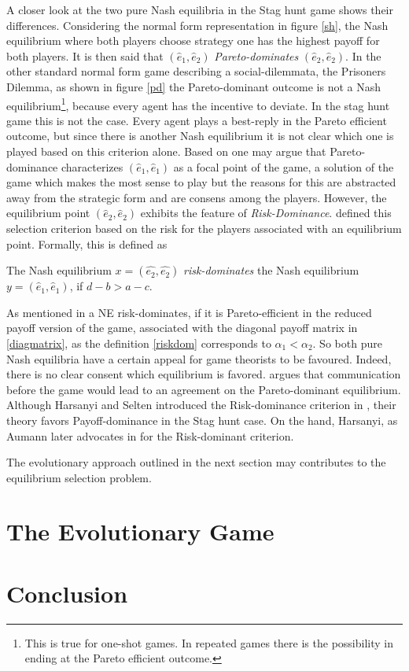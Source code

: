 \documentclass[12pt]{article}
\begin{document}
A closer look at the two pure Nash equilibria in the Stag hunt game 
shows their differences. Considering the normal form representation in figure 
\ref{sh}, the Nash equilibrium where both players choose strategy one has the highest payoff
for both players. It is then said that $(\hat{e}_1,\hat{e}_2)$ 
\textit{Pareto-dominates} $(\hat{e}_2,\hat{e}_2)$. In the other standard 
normal form game describing a social-dilemmata, the Prisoners Dilemma, as 
shown in figure \ref{pd} the Pareto-dominant outcome is not a 
Nash equilibrium\footnote{This is true for one-shot games. 
In repeated games there is the possibility in ending at the Pareto efficient 
outcome.}, because every agent has the incentive to deviate. In the stag hunt
game this is not the case. Every agent plays a best-reply in the Pareto efficient
outcome, but since there is another Nash equilibrium it is not clear 
which one is played based on this criterion alone. Based on \cite{schelling}
one may argue that Pareto-dominance characterizes $(\hat{e}_1,\hat{e}_1)$ 
as a focal point of the game, a solution of the game which makes the most sense to play but the reasons for this are abstracted away from the strategic form and are consens among
the players.  However, the equilibrium point
$(\hat{e}_2,\hat{e}_2)$ exhibits the feature of \textit{Risk-Dominance}. 
\cite{seltenharsanyigeneral} defined this selection criterion based on the
risk for the players associated with an equilibrium point. Formally, this is
defined as 
\begin{mydef}
         The Nash equilibrium $x=(\hat{e_2},\hat{e_2})$ \textit{risk-dominates} 
         the Nash equilibrium $y=(\hat{e}_1,\hat{e}_1)$, if $d-b > a-c$.
         \label{riskdom}
 \end{mydef}
 As mentioned in \cite{weibull} a NE risk-dominates, if it is Pareto-efficient
 in the reduced payoff version of the game, associated with the diagonal
 payoff matrix in \eqref{diagmatrix}, as the definition \ref{riskdom} 
 corresponds to $\alpha_1 < \alpha_2$.
So both pure Nash equilibria have a certain appeal for game theorists to be
favoured. Indeed, there is no clear consent which equilibrium is favored. 
\cite{Whatever} argues that communication before the game would lead to 
an agreement on the Pareto-dominant equilibrium.
Although Harsanyi and Selten introduced the Risk-dominance criterion in 
\cite{seltenharsanyigeneral}, their theory favors Payoff-dominance in the
Stag hunt case. On the hand, Harsanyi, as Aumann later advocates in \cite{harsanyinew} 
for the Risk-dominant criterion. 

The evolutionary approach outlined in the next section may contributes to 
the equilibrium selection problem. 

\section{The Evolutionary Game}


\section{Conclusion}
\printbibliography
\end{document}
